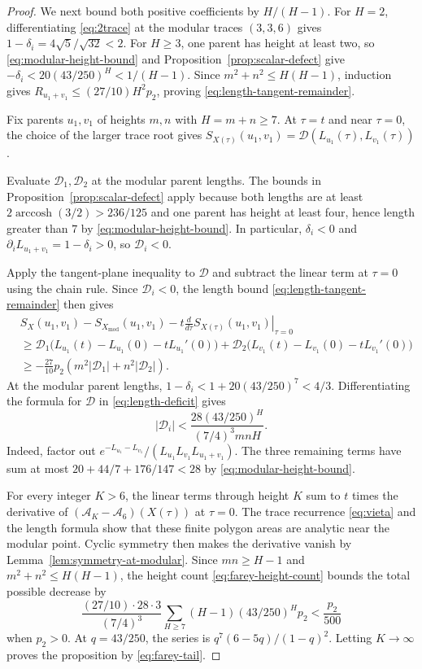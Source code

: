 \documentclass[10pt,twoside]{article}
\theoremstyle{plain}
\theoremstyle{definition}
\theoremstyle{remark}
\DeclareMathOperator{\arccosh}{arccosh}
\newcommand{\A}{\mathcal A}
\newcommand{\Xmod}{X_{\mathrm{mod}}}
\begin{document}
\begin{proof}
We next bound both positive coefficients by $H/(H-1)$.
For $H=2$, differentiating \eqref{eq:2trace} at the modular traces
$(3,3,6)$ gives $1-\delta_i=4\sqrt5/\sqrt{32}<2$.
For $H\geq3$, one parent has height at least two, so
\eqref{eq:modular-height-bound} and Proposition~\ref{prop:scalar-defect}
give $-\delta_i<20(43/250)^H<1/(H-1)$.
Since $m^2+n^2\leq H(H-1)$, induction gives
$R_{u_1+v_1}\leq(27/10)H^2p_2$, proving
\eqref{eq:length-tangent-remainder}.

Fix parents $u_1,v_1$ of heights $m,n$ with $H=m+n\geq7$.
At $\tau=t$ and near $\tau=0$, the choice of the larger trace root gives
$S_{X(\tau)}(u_1,v_1)=\mathcal D(L_{u_1}(\tau),L_{v_1}(\tau))$.

Evaluate $\mathcal D_1,\mathcal D_2$ at the modular parent lengths.
The bounds in Proposition~\ref{prop:scalar-defect} apply because both
lengths are at least $2\arccosh(3/2)>236/125$ and one parent has
height at least four, hence length greater than $7$ by
\eqref{eq:modular-height-bound}. In particular,
$\delta_i<0$ and $\partial_i L_{u_1+v_1}=1-\delta_i>0$, so
$\mathcal D_i<0$.

Apply the tangent-plane inequality to $\mathcal D$ and subtract
the linear term at $\tau=0$ using the chain rule. Since
$\mathcal D_i<0$, the length bound
\eqref{eq:length-tangent-remainder} then gives
$$
\begin{aligned}
&S_X(u_1,v_1)-S_{\Xmod}(u_1,v_1)
-t\left.\frac{d}{d\tau}S_{X(\tau)}(u_1,v_1)\right|_{\tau=0}\\
&\geq
\mathcal D_1\bigl(L_{u_1}(t)-L_{u_1}(0)-tL_{u_1}'(0)\bigr)
+\mathcal D_2\bigl(L_{v_1}(t)-L_{v_1}(0)-tL_{v_1}'(0)\bigr)\\
&\geq
-\frac{27}{10}p_2
\left(m^2|\mathcal D_1|+n^2|\mathcal D_2|\right).
\end{aligned}
$$
At the modular parent lengths,
$1-\delta_i<1+20(43/250)^7<4/3$. Differentiating the formula for
$\mathcal D$ in \eqref{eq:length-deficit} gives
$$
|\mathcal D_i|
<\frac{28(43/250)^H}{(7/4)^3mnH}.
$$
Indeed, factor out
$e^{-L_{u_1}-L_{v_1}}/(L_{u_1}L_{v_1}L_{u_1+v_1})$.
The three remaining terms have sum at most $20+44/7+176/147<28$
by \eqref{eq:modular-height-bound}.

For every integer $K>6$, the linear terms through height $K$ sum
to $t$ times the derivative of $(\A_K-\A_6)(X(\tau))$ at $\tau=0$.
The trace recurrence \eqref{eq:vieta} and the length formula show
that these finite polygon areas are analytic near the modular
point. Cyclic symmetry then makes the derivative vanish by
Lemma~\ref{lem:symmetry-at-modular}.
Since $mn\geq H-1$ and $m^2+n^2\leq H(H-1)$, the height count
\eqref{eq:farey-height-count} bounds the total possible decrease by
$$
\frac{(27/10)\cdot28\cdot3}{(7/4)^3}
\sum_{H\geq7}(H-1)(43/250)^H p_2<\frac{p_2}{500}
$$
when $p_2>0$. At $q=43/250$, the series is $q^7(6-5q)/(1-q)^2$.
Letting $K\to\infty$ proves the proposition by \eqref{eq:farey-tail}.
\end{proof}
\end{document}
